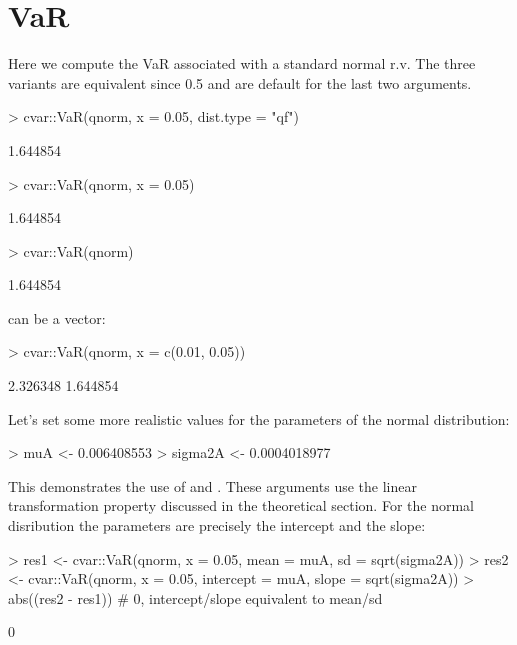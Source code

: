 \documentclass[nojss,article]{jss}
\begin{document}
\section{VaR}
\label{sec:var}

Here we compute the VaR associated with a standard normal r.v.
The three variants are equivalent since 0.5 and  are default for the last two arguments.
\begin{Schunk}
\begin{Sinput}
> cvar::VaR(qnorm, x = 0.05, dist.type = "qf")
\end{Sinput}
\begin{Soutput}
[1] 1.644854
\end{Soutput}
\begin{Sinput}
> cvar::VaR(qnorm, x = 0.05)
\end{Sinput}
\begin{Soutput}
[1] 1.644854
\end{Soutput}
\begin{Sinput}
> cvar::VaR(qnorm)
\end{Sinput}
\begin{Soutput}
[1] 1.644854
\end{Soutput}
\end{Schunk}

 can be a vector:
\begin{Schunk}
\begin{Sinput}
> cvar::VaR(qnorm, x = c(0.01, 0.05))
\end{Sinput}
\begin{Soutput}
[1] 2.326348 1.644854
\end{Soutput}
\end{Schunk}

Let's set some more realistic values for the parameters of the normal distribution:
\begin{Schunk}
\begin{Sinput}
> muA <- 0.006408553
> sigma2A <- 0.0004018977
\end{Sinput}
\end{Schunk}

This demonstrates the use of  and . These arguments use the
linear transformation property discussed in the theoretical section. For the normal
disribution the parameters are precisely the intercept and the slope:
\begin{Schunk}
\begin{Sinput}
> res1 <- cvar::VaR(qnorm, x = 0.05, mean = muA, sd = sqrt(sigma2A))
> res2 <- cvar::VaR(qnorm, x = 0.05, intercept = muA, slope = sqrt(sigma2A))
> abs((res2 - res1)) # 0, intercept/slope equivalent to mean/sd
\end{Sinput}
\begin{Soutput}
[1] 0
\end{Soutput}
\end{Schunk}
\end{document}
